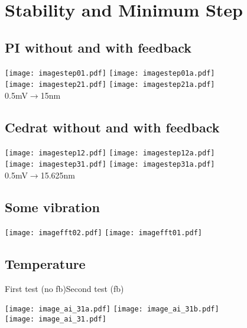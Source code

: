 \section{Stability and Minimum Step}
\subsection{PI without and with feedback}
\texttt{[image: imagestep01.pdf]}
\texttt{[image: imagestep01a.pdf]}\\
\texttt{[image: imagestep21.pdf]}
\texttt{[image: imagestep21a.pdf]}\\
{\scriptsize 0.5mV$\rightarrow$15nm}\\
\subsection{Cedrat without and with feedback}
\texttt{[image: imagestep12.pdf]}
\texttt{[image: imagestep12a.pdf]}\\
\texttt{[image: imagestep31.pdf]}
\texttt{[image: imagestep31a.pdf]}\\
{\scriptsize 0.5mV$\rightarrow$15.625nm}\\
\subsection{Some vibration}
\texttt{[image: imagefft02.pdf]}
\texttt{[image: imagefft01.pdf]}\\
\subsection{Temperature}
\hspace*{1.2cm}First test (no fb)\hspace{2cm}Second test (fb)\par
 \texttt{[image: image\_ai\_31a.pdf]}
 \texttt{[image: image\_ai\_31b.pdf]}\\
 \hspace*{2.5cm}\texttt{[image: image\_ai\_31.pdf]}\\
